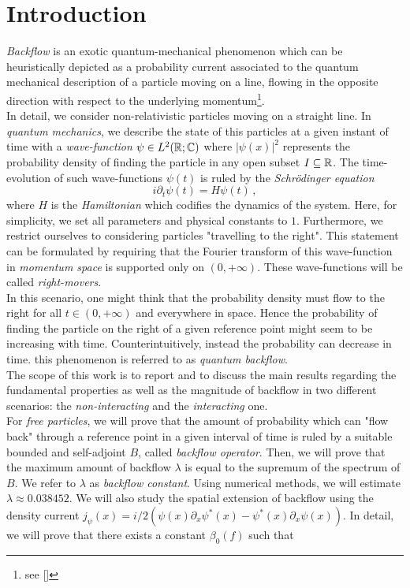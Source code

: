 \chapter{Introduction}
\label{introduction}

\textit{Backflow} is an exotic quantum-mechanical phenomenon which can be heuristically depicted as a probability current associated to the quantum mechanical description of a particle moving on a line, flowing in the opposite direction with respect to the underlying momentum\footnote{see [\citealp[Abstract]{gand}]}.\\
In detail, we consider non-relativistic particles moving on a straight line. In \textit{quantum mechanics}, we describe the state of this particles at a given instant of time with a \textit{wave-function} $\psi\in L^2({\mathbb R};{\mathbb C})$ where $|\psi(x)|^2$ represents the probability density of finding the particle in any open subset $I\subseteq{\mathbb R}$. The time-evolution of such wave-functions $\psi(t)$ is ruled by the \textit{Schr\"{o}dinger equation}
\begin{equation}
	i\partial_t\psi(t)=H\psi(t)\, ,
\end{equation}
where $H$ is the \textit{Hamiltonian} which codifies the dynamics of the system. Here, for simplicity, we set all parameters and physical constants to $1$. Furthermore, we restrict ourselves to considering particles "travelling to the right". This statement can be formulated by requiring that the Fourier transform of this wave-function in \textit{momentum space} is supported only on $(0,+\infty)$. These wave-functions will be called \textit{right-movers}.\\
In this scenario, one might think that the probability density must flow to the right for all $t\in(0,+\infty)$ and everywhere in space. Hence the probability of finding the particle on the right of a given reference point might seem to be increasing with time. Counterintuitively, instead the probability can decrease in time. this phenomenon is referred to as \textit{quantum backflow}.\\
The scope of this work is to report and to discuss the main results regarding the fundamental properties as well as the magnitude of backflow in two different scenarios: the \textit{non-interacting} and the \textit{interacting} one.\\
For \textit{free particles}, we will prove that the amount of probability which can 
"flow back" through a reference point in a given interval of time is ruled by a suitable bounded and self-adjoint  $B$, called \textit{backflow operator}. Then, we will prove that the maximum amount of backflow $\lambda$ is equal to the supremum of the spectrum of $B$. We refer to $\lambda$ as \textit{backflow constant}. Using numerical methods, we will estimate $\lambda\approx0.038452$. We will also study the spatial extension of backflow using the density current $j_\psi(x)=i/2(\psi(x)\partial_x\psi^*(x)-\psi^*(x)\partial_x\psi(x))$. In detail, we will prove that there exists a constant $\beta_0(f)$ such that
